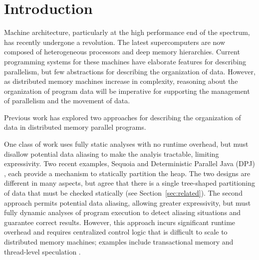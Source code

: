 

\section{Introduction}
\label{sec:intro}

Machine architecture, particularly at the high
performance end of the spectrum, has recently undergone a revolution.  The
latest supercomputers are now composed of heterogeneous processors
and deep memory hierarchies.  Current programming systems for these
machines have elaborate features for describing parallelism, but 
few abstractions for describing the organization of data.  However, as 
distributed memory machines increase in complexity,
reasoning about the organization of program data will be imperative
for supporting the management of parallelism and the movement of data.



Previous work has explored two approaches for describing the organization of data
in distributed memory parallel programs.

One class of work uses fully static analyses with no runtime overhead, but must
disallow potential data aliasing to make the analyis tractable, limiting expressivity.
Two recent examples, Sequoia \cite{Fatahalian06} and 
Deterministic Parallel Java (DPJ) \cite{Bocchino09}, each provide a 
mechanism to statically partition the heap.
The two designs are different in many aspects, but agree that there is
a single tree-shaped partitioning of data that must be checked statically 
(see Section~\ref{sec:related}).  The second approach permits potential data
aliasing, allowing greater expressivity, but must fully dynamic analyses of
program execution to detect aliasing situations and guarantee correct results.
However, this approach incurs significant runtime overhead and requires 
centralized control logic that is difficult to scale to distributed 
memory machines; examples include transactional memory \cite{Harris05} 
and thread-level speculation \cite{Steffan00}.

